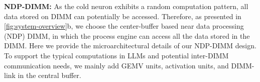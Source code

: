 \textbf{NDP-DIMM:}
As the cold neuron exhibits a random computation pattern, all data stored on DIMM can potentially be accessed. %
Therefore, as presented in \fig \ref{fig:system-overview}b, we choose the center-buffer based near data processing (NDP) DIMM, in which the process engine can access all the data stored in the DIMM.
Here we provide the microarchitectural details of our NDP-DIMM design.
To support the typical computations in LLMs and potential inter-DIMM communication needs, we mainly add GEMV units, activation units, and DIMM-link in the central buffer.

